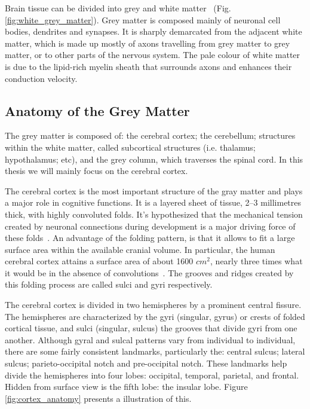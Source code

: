 Brain tissue can be divided into grey and white matter~\cite{Johns} (Fig. \ref{fig:white_grey_matter}).
Grey matter is composed mainly of neuronal cell bodies, dendrites and synapses.
It is sharply demarcated from the adjacent white matter, which is made up mostly
of axons travelling from grey matter to grey matter, or to other parts of the
nervous system. The pale colour of white matter is due to the lipid-rich myelin
sheath that surrounds axons and enhances their conduction velocity\cite{Johns}.


\subsection{Anatomy of the Grey Matter}

The grey matter is composed of: the cerebral cortex; the cerebellum; structures
within the white matter, called subcortical structures (i.e. thalamus; hypothalamus; etc),
and the grey column, which traverses the spinal cord. In this thesis we will
mainly focus on the cerebral cortex.

The cerebral cortex is the most important structure of the gray matter and
plays a major role in cognitive functions. It is a layered sheet of tissue,
2–3 millimetres thick, with highly convoluted folds. It's hypothesized that the
mechanical tension created by neuronal connections during development is a major
driving force of these folds~\cite{VanEssen1997}. An advantage of the folding
pattern, is that it allows to fit a large surface area within the available
cranial volume. In particular, the human cerebral cortex attains a surface area
of about 1600 $cm^2$, nearly three times what it would be in the absence of
convolutions~\cite{VanEssen1997}. The grooves and ridges created by this folding
process are called sulci and gyri respectively.

The cerebral cortex is divided in two hemispheres by a prominent central fissure.
The hemispheres are characterized by the gyri (singular, gyrus) or crests of
folded cortical tissue, and sulci (singular, sulcus) the grooves that divide
gyri from one another. Although gyral and sulcal patterns vary from individual
to individual, there are some fairly consistent landmarks, particularly the: 
central sulcus; lateral sulcus; parieto-occipital notch and pre-occipital notch.
These landmarks help divide the hemispheres into four lobes: occipital, 
temporal, parietal, and frontal. Hidden from surface view is the fifth lobe:
the insular lobe. Figure \ref{fig:cortex_anatomy} presents a illustration of this.

